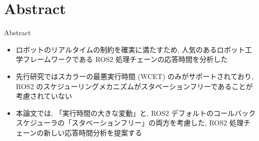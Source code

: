 \section{Abstract}
\label{sec: abstract}

\begin{frame}{Abstract}
    \begin{itemize}
        \item ロボットのリアルタイムの制約を確実に満たすため, 人気のあるロボット工学フレームワークである ROS2 処理チェーンの応答時間を分析した

        \item 先行研究ではスカラーの最悪実行時間 (WCET) のみがサポートされており, ROS2 のスケジューリングメカニズムがスタベーションフリーであることが考慮されていない

        \item 本論文では, 「実行時間の大きな変動」と, ROS2 デフォルトのコールバックスケジューラの「スタベーションフリー」の両方を考慮した, ROS2 処理チェーンの新しい応答時間分析を提案する
    \end{itemize}
\end{frame}
